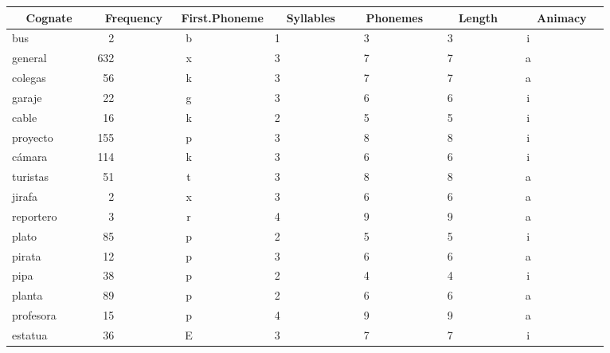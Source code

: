 %
\setlongtables
\begin{longtable}{|l|c|c|c|c|c|c|}
\hline
\multicolumn{1}{|c|}{Cognate}&\multicolumn{1}{c|}{Frequency}&\multicolumn{1}{c|}{First.Phoneme}&\multicolumn{1}{c|}{Syllables}&\multicolumn{1}{c|}{Phonemes}&\multicolumn{1}{c|}{Length}&\multicolumn{1}{c|}{Animacy}\\ \hline
\endhead
\hline\endfoot
bus~~~~~~~~~~&~~2~~~~~~~~~~&b~~~~~~~~~~~~&1~~~~~~~~~~~~&~3~~~~~~~~~~~&~3~~~~~~~~~~~&i~~~~~~~~~~~~\\ 
general~~~~~~&632~~~~~~~~~~&x~~~~~~~~~~~~&3~~~~~~~~~~~~&~7~~~~~~~~~~~&~7~~~~~~~~~~~&a~~~~~~~~~~~~\\ 
colegas~~~~~~&~56~~~~~~~~~~&k~~~~~~~~~~~~&3~~~~~~~~~~~~&~7~~~~~~~~~~~&~7~~~~~~~~~~~&a~~~~~~~~~~~~\\ 
garaje~~~~~~~&~22~~~~~~~~~~&g~~~~~~~~~~~~&3~~~~~~~~~~~~&~6~~~~~~~~~~~&~6~~~~~~~~~~~&i~~~~~~~~~~~~\\ 
cable~~~~~~~~&~16~~~~~~~~~~&k~~~~~~~~~~~~&2~~~~~~~~~~~~&~5~~~~~~~~~~~&~5~~~~~~~~~~~&i~~~~~~~~~~~~\\ 
proyecto~~~~~&155~~~~~~~~~~&p~~~~~~~~~~~~&3~~~~~~~~~~~~&~8~~~~~~~~~~~&~8~~~~~~~~~~~&i~~~~~~~~~~~~\\ 
c\'{a}mara~~~~~~~&114~~~~~~~~~~&k~~~~~~~~~~~~&3~~~~~~~~~~~~&~6~~~~~~~~~~~&~6~~~~~~~~~~~&i~~~~~~~~~~~~\\ 
turistas~~~~~&~51~~~~~~~~~~&t~~~~~~~~~~~~&3~~~~~~~~~~~~&~8~~~~~~~~~~~&~8~~~~~~~~~~~&a~~~~~~~~~~~~\\ 
jirafa~~~~~~~&~~2~~~~~~~~~~&x~~~~~~~~~~~~&3~~~~~~~~~~~~&~6~~~~~~~~~~~&~6~~~~~~~~~~~&a~~~~~~~~~~~~\\ 
reportero~~~~&~~3~~~~~~~~~~&r~~~~~~~~~~~~&4~~~~~~~~~~~~&~9~~~~~~~~~~~&~9~~~~~~~~~~~&a~~~~~~~~~~~~\\ 
plato~~~~~~~~&~85~~~~~~~~~~&p~~~~~~~~~~~~&2~~~~~~~~~~~~&~5~~~~~~~~~~~&~5~~~~~~~~~~~&i~~~~~~~~~~~~\\ 
pirata~~~~~~~&~12~~~~~~~~~~&p~~~~~~~~~~~~&3~~~~~~~~~~~~&~6~~~~~~~~~~~&~6~~~~~~~~~~~&a~~~~~~~~~~~~\\ 
pipa~~~~~~~~~&~38~~~~~~~~~~&p~~~~~~~~~~~~&2~~~~~~~~~~~~&~4~~~~~~~~~~~&~4~~~~~~~~~~~&i~~~~~~~~~~~~\\ 
planta~~~~~~~&~89~~~~~~~~~~&p~~~~~~~~~~~~&2~~~~~~~~~~~~&~6~~~~~~~~~~~&~6~~~~~~~~~~~&a~~~~~~~~~~~~\\ 
profesora~~~~&~15~~~~~~~~~~&p~~~~~~~~~~~~&4~~~~~~~~~~~~&~9~~~~~~~~~~~&~9~~~~~~~~~~~&a~~~~~~~~~~~~\\ 
estatua~~~~~~&~36~~~~~~~~~~&E~~~~~~~~~~~~&3~~~~~~~~~~~~&~7~~~~~~~~~~~&~7~~~~~~~~~~~&i~~~~~~~~~~~~\\ 

\end{longtable}
